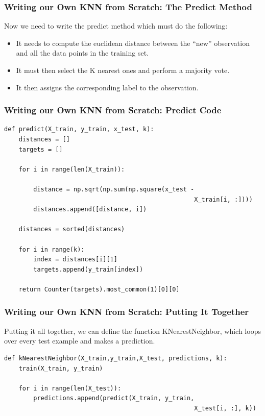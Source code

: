 \begin{frame}[fragile]\frametitle{Writing our Own KNN from Scratch: The Predict Method}
Now we need to write the predict method which must do the following:
\begin{itemize}
\item  It needs to compute the euclidean distance between the ``new'' observation and all the data points in the training set. 
\item It must then select the K nearest ones and perform a majority vote. 
\item It then assigns the corresponding label to the observation. 
\end{itemize}
\end{frame}

\begin{frame}[fragile]\frametitle{Writing our Own KNN from Scratch: Predict Code}
\begin{lstlisting}
def predict(X_train, y_train, x_test, k):
	distances = []
	targets = []

	for i in range(len(X_train)):

		distance = np.sqrt(np.sum(np.square(x_test - 
		                                            X_train[i, :])))
		distances.append([distance, i])

	distances = sorted(distances)

	for i in range(k):
		index = distances[i][1]
		targets.append(y_train[index])

	return Counter(targets).most_common(1)[0][0]
\end{lstlisting}
\end{frame}

\begin{frame}[fragile]\frametitle{Writing our Own KNN from Scratch: Putting It Together}
Putting it all together, we can define the function KNearestNeighbor, which loops over every test example and makes a prediction.
\begin{lstlisting}
def kNearestNeighbor(X_train,y_train,X_test, predictions, k):
	train(X_train, y_train)

	for i in range(len(X_test)):
		predictions.append(predict(X_train, y_train, 
		                                            X_test[i, :], k))
\end{lstlisting}
\end{frame}

